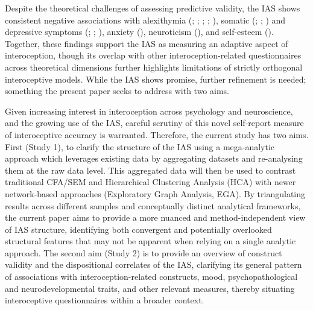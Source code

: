 \documentclass[
  jou,
  floatsintext,
  longtable,
  nolmodern,
  notxfonts,
  notimes,
  colorlinks=true,linkcolor=blue,citecolor=blue,urlcolor=blue]{apa7}
\begin{document}
Despite the theoretical challenges of assessing predictive validity, the
IAS shows consistent negative associations with alexithymia
(;
;
;
;
), somatic
(;
;
) and depressive symptoms
(;
;
), anxiety
(), neuroticism
(), and self-esteem
(). Together, these
findings support the IAS as measuring an adaptive aspect of
interoception, though its overlap with other interoception-related
questionnaires across theoretical dimensions further highlights
limitations of strictly orthogonal interoceptive models. While the IAS
shows promise, further refinement is needed; something the present paper
seeks to address with two aims.

Given increasing interest in interoception across psychology and
neuroscience, and the growing use of the IAS, careful scrutiny of this
novel self-report measure of interoceptive accuracy is warranted.
Therefore, the current study has two aims. First (Study 1), to clarify
the structure of the IAS using a mega-analytic approach which leverages
existing data by aggregating datasets and re-analysing them at the raw
data level. This aggregated data will then be used to contrast
traditional CFA/SEM and Hierarchical Clustering Analysis (HCA) with
newer network-based approaches (Exploratory Graph Analysis, EGA). By
triangulating results across different samples and conceptually distinct
analytical frameworks, the current paper aims to provide a more nuanced
and method-independent view of IAS structure, identifying both
convergent and potentially overlooked structural features that may not
be apparent when relying on a single analytic approach. The second aim
(Study 2) is to provide an overview of construct validity and the
dispositional correlates of the IAS, clarifying its general pattern of
associations with interoception-related constructs, mood,
psychopathological and neurodevelopmental traits, and other relevant
measures, thereby situating interoceptive questionnaires within a
broader context.
\end{document}
